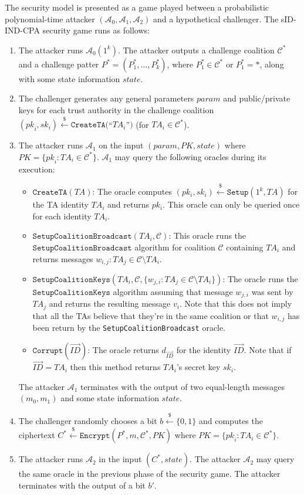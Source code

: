 \documentclass[10pt]{llncs}
\newcommand{\A}{\mathcal{A}}
\newcommand{\C}{\mathcal{C}}
\newcommand{\ID}{\mathit{ID}}
\newcommand{\TA}{\mathit{TA}}
\newcommand{\param}{\mathit{param}}
\newcommand{\pk}{\mathit{pk}}
\newcommand{\sk}{\mathit{sk}}
\newcommand{\getsr}{\stackrel{{\scriptscriptstyle\$}}{\gets}}
\begin{document}
The security model is presented as a game played between a
probabilistic polynomial-time attacker $(\A_{0},\A_{1},\A_{2})$ and
a hypothetical challenger. The sID-IND-CPA security game runs as
follows:
\begin{enumerate}
\item The attacker runs $\A_{0}(1^{k})$. The attacker outputs a
challenge coalition $\C^{*}$ and a challenge patter
$P^{*}=(P^{*}_{1},\ldots,P^{*}_{k})$, where $P^{*}_{1} \in
\C^{*}$ or $P^{*}_{1} = *$, along with some state information $\mathit{state}$.
\item The challenger generates any general parameters $\param$ and
public/private keys for each trust authority in the challenge
coalition $(\pk_{i},\sk_{i}) \getsr
\texttt{CreateTA}($``$\TA_{i}$''$)$ (for $\TA_{i} \in \C^{*}$).
\item The attacker runs $\A_{1}$ on the input $(\param,\mathit{PK},\mathit{state})$
where $\mathit{PK} = \{ \pk_{i} : \TA_{i} \in \C^{*}\}$.
$\A_{1}$ may query the following oracles during its execution:
\begin{itemize}
\item $\texttt{CreateTA}(\TA)$: The oracle computes $(pk_i,sk_i)\getsr \texttt{Setup}(1^{k},\TA)$ for the TA identity $\TA_i$ and returns $pk_i$. This oracle can only be queried once for each identity $\TA_i$.

\item $\texttt{SetupCoalitionBroadcast}(\TA_i,\C)$: This oracle runs the $\texttt{SetupCoalitionBroadcast}$ algorithm for coalition $\C$ containing $\TA_i$ and returns messages $w_{i,j} : \TA_j \in \C \setminus \TA_i$.

\item $\texttt{SetupCoalitionKeys}(\TA_i, \C, \{w_{j,i} : \TA_j \in \C \setminus \TA_i\})$: The oracle runs the $\texttt{SetupCoalitionKeys}$ algorithm assuming that message $w_{j,i}$ was sent by $\TA_{j}$ and returns the resulting message $v_{i}$. Note that this does not imply that all the TAs believe that they're in the same coalition or that $w_{i,j}$ has been return by the \texttt{SetupCoalitionBroadcast} oracle.

\item $\texttt{Corrupt}(\vec{\ID})$: The oracle returns $d_{\vec{\ID}}$ for the identity $\vec{\ID}$.  Note that if $\vec{\ID} = TA_i$ then this method returns $\TA_i$'s secret key $sk_i$.
\end{itemize}
The attacker $\A_{1}$ terminates with the output of two
equal-length messages $(m_{0},m_{1})$ and some state information
$\mathit{state}$.
\item The challenger randomly chooses a bit $b\getsr \{0,1\}$ and
computes the ciphertext $C^{*} \getsr
\texttt{Encrypt}(P^{*},m,\C^{*},\mathit{PK})$ where $\mathit{PK} = \{ \pk_{i} : \TA_{i} \in \C^{*}\}$.
\item The attacker runs $\A_{2}$ in the input
$(C^{*},\mathit{state})$. The attacker $\A_{2}$ may query the
same oracle in the previous phase of the security game. The
attacker terminates with the output of a bit $b'$.
\end{enumerate}
\end{document}
